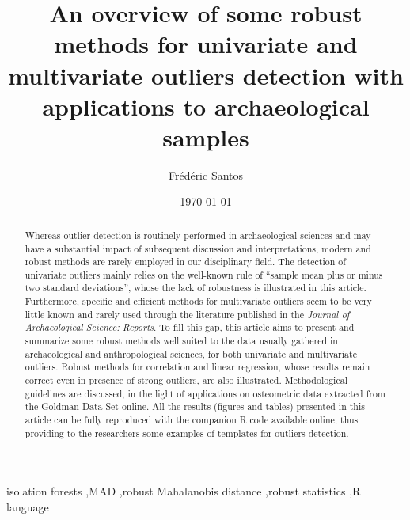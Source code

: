 \documentclass[review, 3p]{elsarticle}
\date{\today}
\title{}
\begin{document}
\begin{frontmatter}

\title{An overview of some robust methods for univariate and multivariate outliers detection with applications to archaeological samples}

\author{Frédéric Santos}
\address{Université de Bordeaux, UMR 5199 PACEA, Bâtiment B8, Allée Geoffroy Saint-Hilaire, CS 50023, 33615 Pessac Cedex, France.}

\begin{abstract}
Whereas outlier detection is routinely performed in archaeological sciences and may have a substantial impact of subsequent discussion and interpretations, modern and robust methods are rarely employed in our disciplinary field. The detection of univariate outliers mainly relies on the well-known rule of ``sample mean plus or minus two standard deviations'', whose the lack of robustness is illustrated in this article. Furthermore, specific and efficient methods for multivariate outliers seem to be very little known and rarely used through the literature published in the \textit{Journal of Archaeological Science: Reports}. To fill this gap, this article aims to present and summarize some robust methods well suited to the data usually gathered in archaeological and anthropological sciences, for both univariate and multivariate outliers. Robust methods for correlation and linear regression, whose results remain correct even in presence of strong outliers, are also illustrated. Methodological guidelines are discussed, in the light of applications on osteometric data extracted from the Goldman Data Set online. All the results (figures and tables) presented in this article can be fully reproduced with the companion R code available online, thus providing to the researchers some examples of templates for outliers detection.
\end{abstract}

\begin{keyword}
isolation forests \sep MAD \sep robust Mahalanobis distance \sep robust statistics \sep R language
\end{keyword}

\end{frontmatter}

\linenumbers
\end{document}
